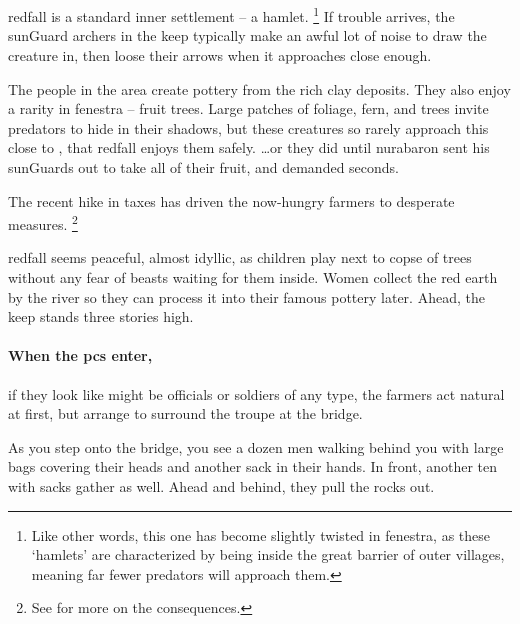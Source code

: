 \section{}
\label{redfallVillage}
\begin{multicols}{2}

\noindent
\Gls{redfall} is a standard inner settlement -- a hamlet.%
\footnote{Like other words, this one has become slightly twisted in \gls{fenestra}, as these `hamlets' are characterized by being inside the great barrier of outer \glspl{village}, meaning far fewer predators will approach them.}
If trouble arrives, the \gls{sunGuard} archers in the keep typically make an awful lot of noise to draw the creature in, then loose their arrows when it approaches close enough.


The people in the area create pottery from the rich clay deposits.
They also enjoy a rarity in \gls{fenestra} -- fruit trees.
Large patches of foliage, fern, and trees invite predators to hide in their shadows, but these creatures so rarely approach this close to , that \gls{redfall} enjoys them safely.
\ldots or they did until \gls{nurabaron} sent his \glspl{sunGuard} out to take all of their fruit, and demanded seconds.

The recent hike in taxes has driven the now-hungry farmers to desperate measures.%
\footnote{See  for more on the consequences.}

\begin{boxtext}
  \Gls{redfall} seems peaceful, almost idyllic, as children play next to copse of trees without any fear of beasts waiting for them inside.
  Women collect the red earth by the river so they can process it into their famous pottery later.
  Ahead, the keep stands three stories high.
\end{boxtext}

\paragraph{When the \glspl{pc} enter,}
if they look like might be officials or soldiers of any type, the farmers act natural at first, but arrange to surround the troupe at the bridge.

\begin{boxtext}
  As you step onto the bridge, you see a dozen men walking behind you with large bags covering their heads and another sack in their hands.
  In front, another ten with sacks gather as well.
  Ahead and behind, they pull the rocks out.


\end{boxtext}
\end{multicols}
